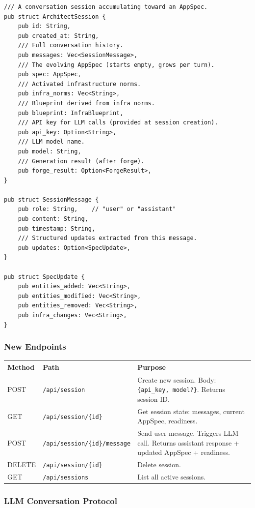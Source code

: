 \documentclass[11pt,a4paper]{article}
\begin{document}
\begin{lstlisting}[style=rust]
/// A conversation session accumulating toward an AppSpec.
pub struct ArchitectSession {
    pub id: String,
    pub created_at: String,
    /// Full conversation history.
    pub messages: Vec<SessionMessage>,
    /// The evolving AppSpec (starts empty, grows per turn).
    pub spec: AppSpec,
    /// Activated infrastructure norms.
    pub infra_norms: Vec<String>,
    /// Blueprint derived from infra norms.
    pub blueprint: InfraBlueprint,
    /// API key for LLM calls (provided at session creation).
    pub api_key: Option<String>,
    /// LLM model name.
    pub model: String,
    /// Generation result (after forge).
    pub forge_result: Option<ForgeResult>,
}

pub struct SessionMessage {
    pub role: String,    // "user" or "assistant"
    pub content: String,
    pub timestamp: String,
    /// Structured updates extracted from this message.
    pub updates: Option<SpecUpdate>,
}

pub struct SpecUpdate {
    pub entities_added: Vec<String>,
    pub entities_modified: Vec<String>,
    pub entities_removed: Vec<String>,
    pub infra_changes: Vec<String>,
}
\end{lstlisting}

\subsubsection{New Endpoints}

\begin{longtable}{llp{6cm}}
\toprule
\textbf{Method} & \textbf{Path} & \textbf{Purpose} \\
\midrule
POST & \texttt{/api/session} 
  & Create new session. Body: \texttt{\{api\_key, model?\}}. 
    Returns session ID. \\
GET & \texttt{/api/session/\{id\}} 
  & Get session state: messages, current AppSpec, readiness. \\
POST & \texttt{/api/session/\{id\}/message} 
  & Send user message. Triggers LLM call. Returns assistant 
    response + updated AppSpec + readiness. \\
DELETE & \texttt{/api/session/\{id\}} 
  & Delete session. \\
GET & \texttt{/api/sessions} 
  & List all active sessions. \\
\bottomrule
\end{longtable}

\subsubsection{LLM Conversation Protocol}
\end{document}

